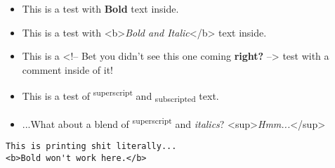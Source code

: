\documentclass[12pt]{article}
\begin{document}
\begin{itemize}
	\item This is a test with \textbf{Bold} text inside.

	\item This is a test with <b>\textit{Bold and Italic}</b> text inside.

	\item This is a <!-- Bet you didn't see this one coming \textbf{right?} --> test with a comment inside of it!

	\item This is a test of \textsuperscript{superscript} and \textsubscript{subscripted} text.

	\item ...What about a blend of \textsuperscript{superscript} and \textit{italics}? <sup>\textit{Hmm...}</sup>

\end{itemize}
\begin{verbatim}This is printing shit literally...
<b>Bold won't work here.</b>\end{verbatim}
\end{document}
